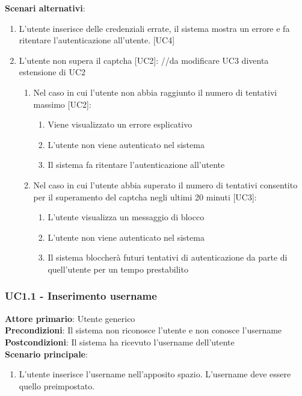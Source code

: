 \textbf{Scenari alternativi}:
\begin{enumerate}
    \item L'utente inserisce delle credenziali errate, il sistema mostra un errore e fa ritentare l'autenticazione all'utente. [UC4]
    \item L'utente non supera il captcha [UC2]: //da modificare UC3 diventa estensione di UC2
    \begin{enumerate}
	\item Nel caso in cui l'utente non abbia raggiunto il numero di tentativi massimo [UC2]:
	\begin{enumerate}
	    \item Viene visualizzato un errore esplicativo
	    \item L'utente non viene autenticato nel sistema
	    \item Il sistema fa ritentare l'autenticazione all'utente 
        \end{enumerate}
	\item Nel caso in cui l'utente abbia superato il numero di tentativi consentito per il superamento del captcha negli ultimi 20 minuti [UC3]:
	\begin{enumerate}
	    \item L'utente visualizza un messaggio di blocco
	    \item L'utente non viene autenticato nel sistema
	    \item Il sistema bloccherà futuri tentativi di autenticazione da parte di quell'utente per un tempo prestabilito
        \end{enumerate}
    \end{enumerate}
\end{enumerate}

\subsubsection{UC1.1 - Inserimento username}
\textbf{Attore primario}: Utente generico\\
\textbf{Precondizioni}: Il sistema non riconosce l'utente e non conosce l'username\\
\textbf{Postcondizioni}: Il sistema ha ricevuto l'username dell'utente\\
\textbf{Scenario principale}:
\begin{enumerate}
   \item L'utente inserisce l'username nell'apposito spazio. L'username deve essere quello preimpostato.
\end{enumerate}

